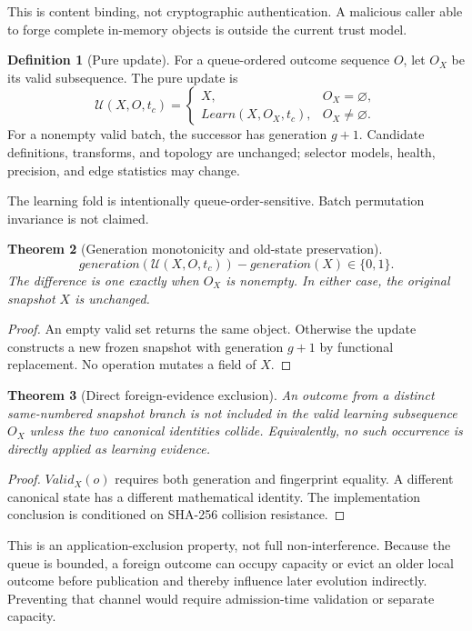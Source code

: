 \documentclass[11pt]{article}
\theoremstyle{definition}
\newtheorem{definition}{Definition}[section]
\theoremstyle{plain}
\newtheorem{theorem}[definition]{Theorem}
\begin{document}
This is content binding, not cryptographic authentication.  A malicious caller
able to forge complete in-memory objects is outside the current trust model.

\begin{definition}[Pure update]
For a queue-ordered outcome sequence $O$, let $O_X$ be its valid subsequence.
The pure update is
\[
\mathcal U(X,O,t_c)=
\begin{cases}
X,&O_X=\varnothing,\\
Learn(X,O_X,t_c),&O_X\ne\varnothing.
\end{cases}
\]
For a nonempty valid batch, the successor has generation $g+1$.  Candidate
definitions, transforms, and topology are unchanged; selector models, health,
precision, and edge statistics may change.
\end{definition}

The learning fold is intentionally queue-order-sensitive.  Batch permutation
invariance is not claimed.

\begin{theorem}[Generation monotonicity and old-state preservation]
\label{thm:generation}
\[
generation(\mathcal U(X,O,t_c))-generation(X)\in\{0,1\}.
\]
The difference is one exactly when $O_X$ is nonempty.  In either case, the
original snapshot $X$ is unchanged.
\end{theorem}

\begin{proof}
An empty valid set returns the same object.  Otherwise the update constructs a
new frozen snapshot with generation $g+1$ by functional replacement.  No
operation mutates a field of $X$.
\end{proof}

\begin{theorem}[Direct foreign-evidence exclusion]
\label{thm:branch}
An outcome from a distinct same-numbered snapshot branch is not included in
the valid learning subsequence $O_X$ unless the two canonical identities
collide.  Equivalently, no such occurrence is directly applied as learning
evidence.
\end{theorem}

\begin{proof}
$Valid_X(o)$ requires both generation and fingerprint equality.  A different
canonical state has a different mathematical identity.  The implementation
conclusion is conditioned on SHA-256 collision resistance.
\end{proof}

This is an application-exclusion property, not full non-interference.  Because
the queue is bounded, a foreign outcome can occupy capacity or evict an older
local outcome before publication and thereby influence later evolution
indirectly.  Preventing that channel would require admission-time validation or
separate capacity.
\end{document}
